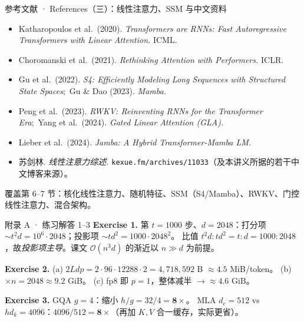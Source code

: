 \documentclass[aspectratio=169,10pt]{beamer}
\newcommand{\bigO}[1]{\mathcal{O}\!\left(#1\right)}
\begin{document}
\begin{frame}{参考文献 · References（三）：线性注意力、SSM 与中文资料}
  \footnotesize
  \begin{itemize}
    \item Katharopoulos et al.\ (2020). \emph{Transformers are RNNs: Fast Autoregressive Transformers with Linear Attention.} ICML.
    \item Choromanski et al.\ (2021). \emph{Rethinking Attention with Performers.} ICLR.
    \item Gu et al.\ (2022). \emph{S4: Efficiently Modeling Long Sequences with Structured State Spaces};\ Gu \& Dao (2023). \emph{Mamba.}
    \item Peng et al.\ (2023). \emph{RWKV: Reinventing RNNs for the Transformer Era};\ Yang et al.\ (2024). \emph{Gated Linear Attention (GLA).}
    \item Lieber et al.\ (2024). \emph{Jamba: A Hybrid Transformer-Mamba LM.}
    \item 苏剑林. \emph{线性注意力综述.} \texttt{kexue.fm/archives/11033}（及本讲义所据的若干中文博客来源）。
  \end{itemize}
  \vspace{2pt}
  \textcolor{TLinkSoft}{覆盖第 6--7 节：核化线性注意力、随机特征、SSM（S4/Mamba）、RWKV、门控线性注意力、混合架构。}
\end{frame}

\appendix


\begin{frame}{附录 A · 练习解答 1--3}
  \footnotesize
  \textbf{Exercise 1.} 第 $t{=}1000$ 步、$d{=}2048$：打分项 $\sim t^2 d=10^6\cdot2048$；投影项 $\sim t d^2=1000\cdot2048^2$。
  比值 $t^2d : td^2 = t:d = 1000:2048$，故\emph{投影项主导}。课文 $\bigO{n^3d}$ 的渐近以 $n\gg d$ 为前提。
  \medskip

  \textbf{Exercise 2.} (a) $2Ldp=2\cdot96\cdot12288\cdot2=4{,}718{,}592$ B $\approx 4.5$ MiB/token。
  (b) $\times n{=}2048 \approx 9.2$ GiB。 (c) fp8 即 $p{=}1$，整体减半 $\to \approx 4.6$ GiB。
  \medskip

  \textbf{Exercise 3.} GQA $g{=}4$：缩小 $h/g=32/4=\mathbf{8\times}$。
  MLA $d_c{=}512$ vs $hd_k{=}4096$：$4096/512=\mathbf{8\times}$（再加 $K,V$ 合一缓存，实际更省）。
\end{frame}
\end{document}
